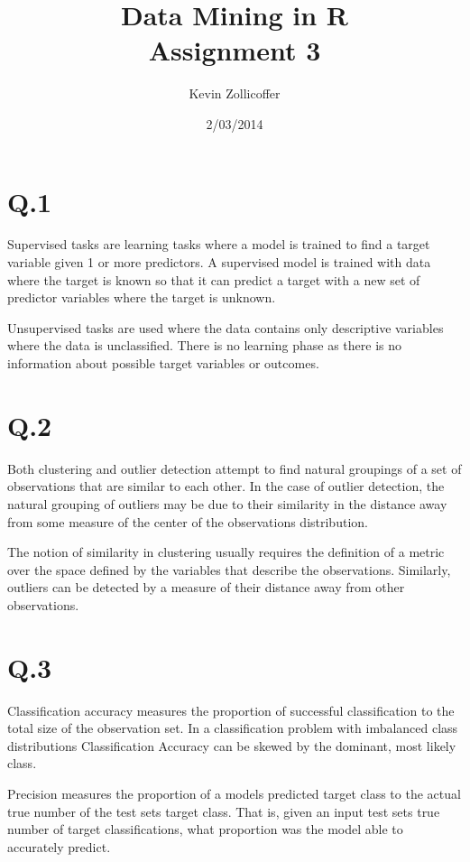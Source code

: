 \documentclass{article}
\author{Kevin Zollicoffer}
\title{Data Mining in R\\Assignment 3}
\date{2/03/2014}
\begin{document}
\maketitle


\section*{Q.1}
Supervised tasks are learning tasks where a model is trained to find a target variable given 1 or more predictors. A supervised model is trained with data where the target is known so that it can predict a target with a new set of predictor variables where the target is unknown. 

Unsupervised tasks are used where the data contains only descriptive variables where the data is unclassified. There is no learning phase as there is no information about possible target variables or outcomes. 

\section*{Q.2}
Both clustering and outlier detection attempt to find natural groupings of a set of observations that are similar to each other. In the case of outlier detection, the natural grouping of outliers may be due to their similarity in the distance away from some measure of the center of the observations distribution. 

The notion of similarity in clustering usually requires the definition of a metric over the space defined by the variables that describe the observations. Similarly, outliers can be detected by a measure of their distance away from other observations. 

\section*{Q.3}
Classification accuracy measures the proportion of successful classification to the total size of the observation set. In a classification problem with imbalanced class distributions Classification Accuracy can be skewed by the dominant, most likely class. 

Precision measures the proportion of a models predicted target class to the actual true number of the test sets target class. That is, given an input test sets true number of target classifications, what proportion was the model able to accurately predict.  
\end{document}
